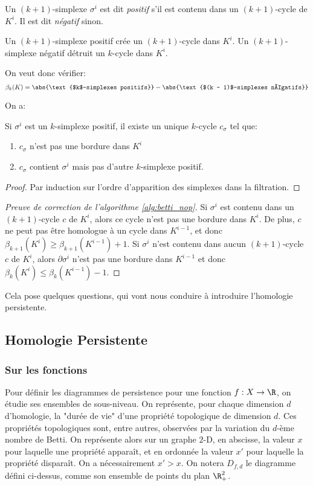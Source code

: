 \begin{definition}
	Un $(k + 1)$-simplexe $\sigma^{i}$ est dit \emph{positif} s'il est contenu dans un $(k + 1)$-cycle de $K^{i}$.
	Il est dit \emph{négatif} sinon.
\end{definition}
Un $(k + 1)$-simplexe positif crée un $(k + 1)$-cycle dans $K^{i}$.
Un $(k + 1)$-simplexe négatif détruit un $k$-cycle dans $K^{i}$.

On veut donc vérifier:
\begin{equation*}
	\beta_{k}(K) = \abs{\text{$k$-simplexes positifs}} - \abs{\text{$(k - 1)$-simplexes négatifs}}
\end{equation*}

On a:
\begin{lemme}
	\label{lem:filter_cycle}
	Si $\sigma^{i}$ est un $k$-simplexe positif, il existe un unique $k$-cycle $c_{\sigma}$ tel que:
	\begin{enumerate}
		\item $c_{\sigma}$ n'est pas une bordure dans $K^{i}$
		\item $c_{\sigma}$ contient $\sigma^{i}$ mais pas d'autre $k$-simplexe positif.
	\end{enumerate}
\end{lemme}
\begin{proof}
	Par induction sur l'ordre d'apparition des simplexes dans la filtration.
\end{proof}

\begin{proof}[Preuve de correction de l'algorithme \ref{alg:betti_nop}]
	Si $\sigma^{i}$ est contenu dans un $(k + 1)$-cycle $c$ de $K^{i}$, alors ce cycle n'est pas une bordure dans $K^{i}$.
	De plus, $c$ ne peut pas être homologue à un cycle dans $K^{i - 1}$, et donc $\beta_{k + 1}\left(K^{i}\right) \geq \beta_{k + 1}(K^{i - 1}) + 1$.
	Si $\sigma^{i}$ n'est contenu dans aucun $(k + 1)$-cycle $c$ de $K^{i}$, alors $\partial\sigma^{i}$ n'est pas une bordure dans $K^{i - 1}$ et donc $\beta_{k}(K^{i}) \leq \beta_{k}\left(K^{i - 1}\right) - 1$.
\end{proof}

Cela pose quelques questions, qui vont nous conduire à introduire l'homologie persistente.

\subsection{Homologie Persistente}
\subsubsection{Sur les fonctions}
Pour définir les diagrammes de persistence pour une fonction $f: X \to \R$, on étudie ses
ensembles de sous-niveau.
On représente, pour chaque dimension $d$ d'homologie, la "durée de vie" d'une propriété topologique de dimension $d$.
Ces propriétés topologiques sont, entre autres, observées par la variation du $d$-ème nombre de Betti.
On représente alors sur un graphe $2$-D, en abscisse, la valeur $x$ pour laquelle une propriété apparaît, et en ordonnée la valeur $x'$ pour laquelle la propriété disparaît.
On a nécessairement $x' > x$.
On notera $D_{f, d}$ le diagramme défini ci-dessus, comme son ensemble de points du plan $\R_{+}^{2}$.


